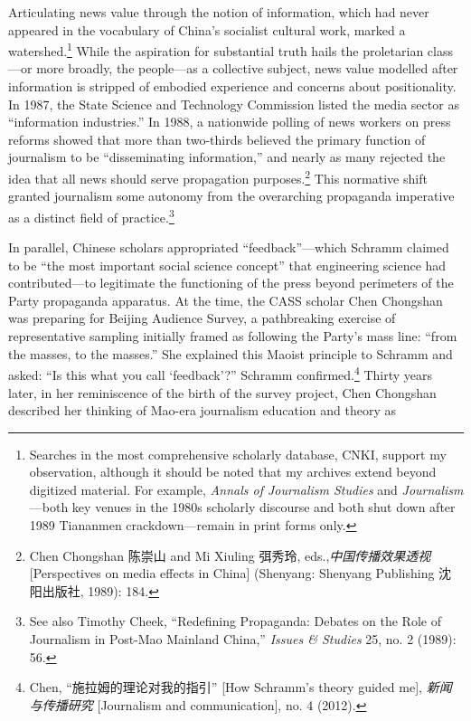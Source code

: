 \documentclass{tufte-handout}
\begin{document}
\begin{CJK*}{UTF8}{gbsn}
Articulating news value through the notion of information, which had
never appeared in the vocabulary of China's socialist cultural work,
marked a watershed.\footnote{Searches in the most comprehensive
  scholarly database, CNKI, support my observation, although it should
  be noted that my archives extend beyond digitized material. For
  example, \emph{Annals of Journalism Studies} and
  \emph{Journalism}---both key venues in the 1980s scholarly discourse
  and both shut down after 1989 Tiananmen crackdown---remain in print
  forms only.} While the aspiration for substantial truth hails the
proletarian class---or more broadly, the people---as a collective
subject, news value modelled after information is stripped of embodied
experience and concerns about positionality. In 1987, the State Science
and Technology Commission listed the media sector as ``information
industries.'' In 1988, a nationwide polling of news workers on press
reforms showed that more than two-thirds believed the primary function
of journalism to be ``disseminating information,'' and nearly as many
rejected the idea that all news should serve propagation
purposes.\footnote{Chen Chongshan 陈崇山 and Mi Xiuling 弭秀玲,
  eds.,\emph{中国传播效果透视} {[}Perspectives on media effects in
  China{]} (Shenyang: Shenyang Publishing 沈阳出版社, 1989): 184.} This
normative shift granted journalism some autonomy from the overarching
propaganda imperative as a distinct field of practice.\footnote{See also
  Timothy Cheek, ``Redefining Propaganda: Debates on the Role of
  Journalism in Post-Mao Mainland China,'' \emph{Issues \& Studies} 25,
  no. 2 (1989): 56.}

In parallel, Chinese scholars appropriated ``feedback''---which Schramm
claimed to be ``the most important social science concept'' that
engineering science had contributed---to legitimate the functioning of
the press beyond perimeters of the Party propaganda apparatus. At the
time, the CASS scholar Chen Chongshan was preparing for Beijing Audience
Survey, a pathbreaking exercise of representative sampling initially
framed as following the Party's mass line: ``from the masses, to the
masses.'' She explained this Maoist principle to Schramm and asked: ``Is
this what you call `feedback'?'' Schramm confirmed.\footnote{Chen,
  ``施拉姆的理论对我的指引'' {[}How Schramm's theory guided me{]},
  \emph{新闻与传播研究} {[}Journalism and communication{]}, no. 4
  (2012).} Thirty years later, in her reminiscence of the birth of the
survey project, Chen Chongshan described her thinking of Mao-era
journalism education and theory as


\end{CJK*}
\end{document}
